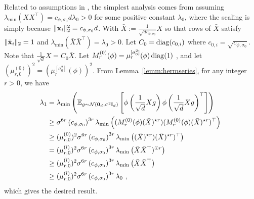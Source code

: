 Related to assumptions in \cite{SD-JL-HL-LW-XZ:19}, the simplest analysis comes from assuming $\lambda_{\min}(XX^\top) = c_{\phi,\sigma_0} d \lambda_0 > 0$ for some positive constant $\lambda_0$,  where the scaling is simply because $\|\mathbf{x}_i\|_2^2 = c_{\phi,\sigma_0} d$. With $\bar{X}:=\frac{1}{\sqrt{d c_{\phi,\sigma_0}}}X$ so that rows of $\bar{X}$ satisfy $\|\bar{\mathbf{x}}_i\|_2 = 1$ and $\lambda_{\min}(\bar{X}\bar{X}^\top) = \lambda_0 > 0$.
Let $C_0 = \operatorname{diag}(c_{0,i})$ where $c_{0,i} = \sqrt{c_{\phi,\sigma_0}}$. Note that $\frac{1}{\sqrt{d}} X = C_0 \bar{X}$. 
Let $M^{(0)}_r(\phi) = \mu_r^{[\sigma_0^2]}(\phi) \operatorname{diag}( 1)$ , and let $(\mu_{r,0}^{(0)})^2 =  \left( \mu_r^{[\sigma_0^2]}(\phi) \right)^2$. From Lemma~\ref{lemm:hermseries}, for any integer $r > 0$, we have 
\begin{align*}
\lambda_{1} & = \lambda_{\min} \left( \mathbb{E}_{g \sim {\cal N}(\bm{0}_{d},\sigma^2 \mathbb{I}_{d})}\left[ \phi\left( \frac{1}{\sqrt{d}} X g\right) \phi\left( \frac{1}{\sqrt{d}} X g\right)^\top \right] \right) \\
& \geq \sigma^{6r} \left( c_{\phi,\sigma_0} \right)^{3r} \lambda_{\min} \left( (M_r^{(0)}(\phi) (\bar{X})^{\star r}) (M_r^{(0)}(\phi) (\bar{X})^{\star r})^\top \right)~\\ 
& \geq (\mu_{r,0}^{(0)})^2 \sigma^{6r} \left( c_{\phi,\sigma_0} \right)^{3r} \lambda_{\min} \left( (\bar{X})^{\star r}) (\bar{X})^{\star r})^\top \right)~\\ 
& = (\mu_{r,0}^{(l)})^2 \sigma^{6r} \left( c_{\phi,\sigma_0} \right)^{3r} \lambda_{\min} \left( \bar{X} \bar{X}^\top)^{\odot r} \right)~\\ 
& \geq (\mu_{r,0}^{(l)})^2 \sigma^{6r} \left( c_{\phi,\sigma_0} \right)^{3r} \lambda_{\min} \left( \bar{X} \bar{X}^\top \right) \\
& \geq (\mu_{r,0}^{(l)})^2 \sigma^{6r} \left( c_{\phi,\sigma_0} \right)^{3r} \lambda_0~,
\end{align*}
which gives the desired result.


